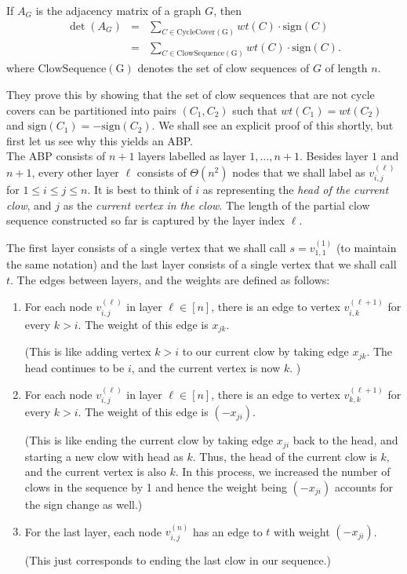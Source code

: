 \begin{lemma}[\cite{mv97}]\label{lem:mv-clowseq} If $A_G$ is the adjacency matrix of a graph $G$, then
\begin{eqnarray*}
\det(A_G) & = &  \sum_{C \in \mathrm{CycleCover(G)}} wt(C) \cdot \mathrm{sign}(C)\\
& = & \sum_{C \in \mathrm{ClowSequence(G)}} wt(C) \cdot \mathrm{sign}(C).
\end{eqnarray*}
where $\mathrm{ClowSequence(G)}$ denotes the set of clow sequences of $G$ of length $n$.
\end{lemma}

They prove this by showing that the set of clow sequences that are not cycle covers can be partitioned into pairs $(C_1,C_2)$ such that $wt(C_1) = wt(C_2)$ and $\mathrm{sign}(C_1) = - \mathrm{sign}(C_2)$. 
We shall see an explicit proof of this shortly, but first let us see why this yields an ABP. \\

The ABP consists of $n+1$ layers labelled as layer $1,\dots, n+1$. 
Besides layer $1$ and $n+1$, every other layer $\ell$ consists of $\Theta(n^2)$ nodes that we shall label as $v_{i,j}^{(\ell)}$ for $1\leq i\leq j\leq n$. 
It is best to think of $i$ as representing the \emph{head of the current clow}, and $j$ as the \emph{current vertex in the clow}. 
The length of the partial clow sequence constructed so far is captured by the layer index $\ell$. 

The first layer consists of a single vertex that we shall call $s = v_{1,1}^{(1)}$ (to maintain the same notation)  and the last layer consists of a single vertex that we shall call $t$. 
The edges between layers, and the weights are defined as follows:

\begin{enumerate}
\item For each node $v_{i,j}^{(\ell)}$ in layer $\ell \in [n]$, there is an edge to vertex $v_{i,k}^{(\ell+1)}$ for every $k > i$. 
The weight of this edge is $x_{jk}$. 

(This is like adding vertex $k > i$ to our current clow by taking edge $x_{jk}$. 
The head continues to be $i$, and the current vertex is now $k$. )
\item For each node $v_{i,j}^{(\ell)}$ in layer $\ell \in [n]$, there is an edge to vertex $v_{k,k}^{(\ell+1)}$ for every $k > i$. 
The weight of this edge is $(-x_{ji})$. 

(This is like ending the current clow by taking edge $x_{ji}$ back to the head, and starting a new clow with head as $k$. 
Thus, the head of the current clow is $k$, and the current vertex is also $k$. 
In this process, we increased the number of clows in the sequence by 1 and hence the weight being $(-x_{ji})$ accounts for the sign change as well.)

\item For the last layer, each node $v_{i,j}^{(n)}$ has an edge to $t$ with weight $(-x_{ji})$. 

(This just corresponds to ending the last clow in our sequence.)
\end{enumerate}



